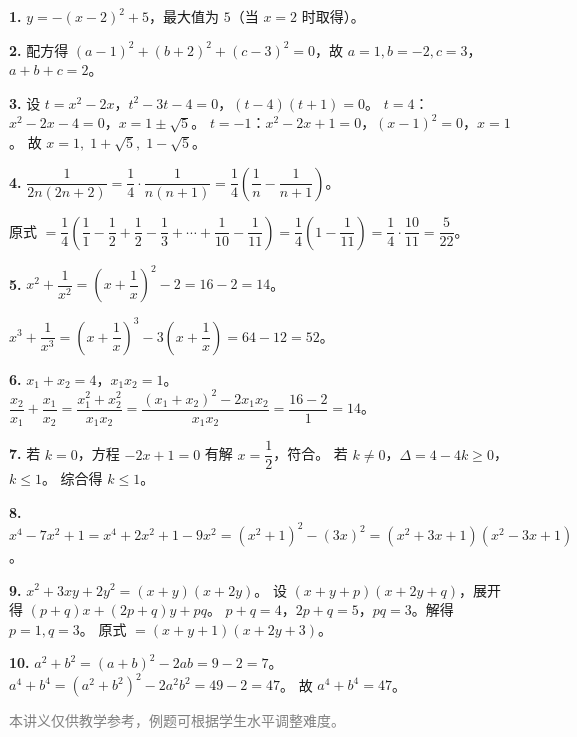 \documentclass[12pt, a4paper]{ctexart}
\begin{document}
\begin{knowledgebox}[参考答案]
\textbf{1.} $y = -(x-2)^2 + 5$，最大值为 $\boxed{5}$（当 $x=2$ 时取得）。

\medskip

\textbf{2.} 配方得 $(a-1)^2+(b+2)^2+(c-3)^2=0$，故 $a=1, b=-2, c=3$，$a+b+c = \boxed{2}$。

\medskip

\textbf{3.} 设 $t=x^2-2x$，$t^2-3t-4=0$，$(t-4)(t+1)=0$。
$t=4$：$x^2-2x-4=0$，$x=1\pm\sqrt{5}$。
$t=-1$：$x^2-2x+1=0$，$(x-1)^2=0$，$x=1$。
故 $x = \boxed{1,\; 1+\sqrt{5},\; 1-\sqrt{5}}$。

\medskip

\textbf{4.} $\dfrac{1}{2n(2n+2)} = \dfrac{1}{4}\cdot\dfrac{1}{n(n+1)} = \dfrac{1}{4}\left(\dfrac{1}{n}-\dfrac{1}{n+1}\right)$。

原式 $= \dfrac{1}{4}\left(\dfrac{1}{1}-\dfrac{1}{2}+\dfrac{1}{2}-\dfrac{1}{3}+\cdots+\dfrac{1}{10}-\dfrac{1}{11}\right) = \dfrac{1}{4}\left(1-\dfrac{1}{11}\right) = \dfrac{1}{4}\cdot\dfrac{10}{11} = \boxed{\dfrac{5}{22}}$。

\medskip

\textbf{5.} $x^2+\dfrac{1}{x^2} = \left(x+\dfrac{1}{x}\right)^2-2 = 16-2 = \boxed{14}$。

$x^3+\dfrac{1}{x^3} = \left(x+\dfrac{1}{x}\right)^3 - 3\left(x+\dfrac{1}{x}\right) = 64-12 = \boxed{52}$。

\medskip

\textbf{6.} $x_1+x_2=4$，$x_1 x_2=1$。$\dfrac{x_2}{x_1}+\dfrac{x_1}{x_2} = \dfrac{x_1^2+x_2^2}{x_1 x_2} = \dfrac{(x_1+x_2)^2-2x_1 x_2}{x_1 x_2} = \dfrac{16-2}{1} = \boxed{14}$。

\medskip

\textbf{7.} 若 $k=0$，方程 $-2x+1=0$ 有解 $x=\dfrac{1}{2}$，符合。
若 $k\neq 0$，$\Delta = 4-4k \geqslant 0$，$k \leqslant 1$。
综合得 $\boxed{k \leqslant 1}$。

\medskip

\textbf{8.} $x^4-7x^2+1 = x^4+2x^2+1-9x^2 = (x^2+1)^2-(3x)^2 = (x^2+3x+1)(x^2-3x+1)$。

\medskip

\textbf{9.} $x^2+3xy+2y^2 = (x+y)(x+2y)$。
设 $(x+y+p)(x+2y+q)$，展开得 $(p+q)x+(2p+q)y+pq$。
$p+q=4$，$2p+q=5$，$pq=3$。解得 $p=1, q=3$。
原式 $= \boxed{(x+y+1)(x+2y+3)}$。

\medskip

\textbf{10.} $a^2+b^2=(a+b)^2-2ab=9-2=7$。
$a^4+b^4 = (a^2+b^2)^2-2a^2 b^2 = 49-2=47$。
故 $a^4+b^4 = \boxed{47}$。
\end{knowledgebox}

\vfill
\begin{center}
\small\textcolor{gray}{本讲义仅供教学参考，例题可根据学生水平调整难度。}
\end{center}
\end{document}
